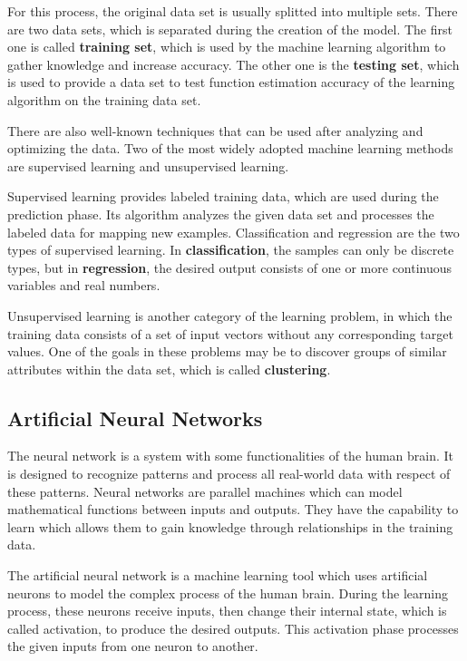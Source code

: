For this process, the original data set is usually splitted into multiple sets. There are two data sets, which is separated during the creation of the model. The first one is called \textbf{training set}, which is used by the machine learning algorithm to gather knowledge and increase accuracy. The other one is the \textbf{testing set}, which is used to provide a data set to test function estimation accuracy of the learning algorithm on the training data set. \medskip

There are also well-known techniques that can be used after analyzing and optimizing the data. Two of the most widely adopted machine learning methods are supervised learning and unsupervised learning.\smallskip

Supervised learning provides labeled training data, which are used during the prediction phase. Its algorithm analyzes the given data set and processes the labeled data for mapping new examples. Classification and regression are the two types of supervised learning. In \textbf{classification}, the samples can only be discrete types, but in \textbf{regression}, the desired output consists of one or more continuous variables and real numbers.

Unsupervised learning is another category of the learning problem, in which the training data consists of a set of input vectors without any corresponding target values. One of the goals in these problems may be to discover groups of similar attributes within the data set, which is called \textbf{clustering}.\medskip



\subsection{Artificial Neural Networks}

The neural network is a system with some functionalities of the human brain. It is designed to recognize patterns and process all real-world data with respect of these patterns. Neural networks are parallel machines which can model mathematical functions between inputs and outputs. They have the capability to learn which allows them to gain knowledge through relationships in the training data.  \medskip

The artificial neural network is a machine learning tool which uses artificial neurons to model the complex process of the human brain. During the learning process, these neurons receive inputs, then change their internal state, which is called activation, to produce the desired outputs. This activation phase processes the given inputs from one neuron to another.

